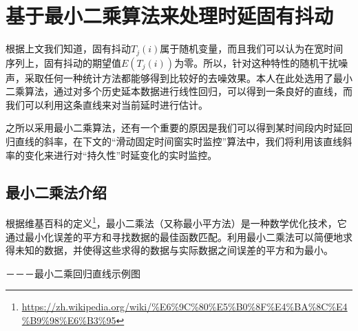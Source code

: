 \section{基于最小二乘算法来处理时延固有抖动}
根据上文我们知道，固有抖动$T_{j}(i)$属于随机变量，而且我们可以认为在宽时间序列上，固有抖动的期望值$E(T_{j}(i))$为零。所以，针对这种特性的随机干扰噪声，采取任何一种统计方法都能够得到比较好的去噪效果。本人在此处选用了最小二乘算法，通过对多个历史延本数据进行线性回归，可以得到一条良好的直线，而我们可以利用这条直线来对当前延时进行估计。

之所以采用最小二乘算法，还有一个重要的原因是我们可以得到某时间段内时延回归直线的斜率，在下文的“滑动固定时间窗实时监控”算法中，我们将利用该直线斜率的变化来进行对“持久性”时延变化的实时监控。

\subsection{最小二乘法介绍}
根据维基百科的定义\footnote{\url{https://zh.wikipedia.org/wiki/\%E6\%9C\%80\%E5\%B0\%8F\%E4\%BA\%8C\%E4\%B9\%98\%E6\%B3\%95}}，最小二乘法（又称最小平方法）是一种数学优化技术，它通过最小化误差的平方和寻找数据的最佳函数匹配。利用最小二乘法可以简便地求得未知的数据，并使得这些求得的数据与实际数据之间误差的平方和为最小。

－－－最小二乘回归直线示例图

